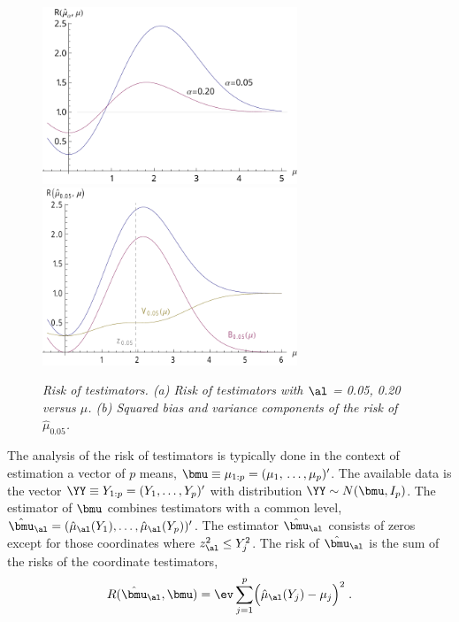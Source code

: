 \documentclass[12pt]{article}
\begin{document}
 \begin{figure}
 \caption{ \label{fig:risk} \sl Risk of testimators. (a) Risk of testimators with
 $\al$ = 0.05, 0.20 versus $\mu$. (b) Squared bias and variance components of the
 risk of $\hat\mu_{0.05}$. } 
 \vspace{0.1in}
\centerline{
 \includegraphics[width=3.0in]{figures/risk_a}
 \includegraphics[width=3.0in]{figures/risk_b} }
 \vspace{0.2in}
 \end{figure}
 

 The analysis of the risk of testimators is typically done in the context of
 estimation a vector of $p$ means, $\bmu \equiv \mu_{1:p} =
 (\mu_1, \,\ldots, \mu_p)'$.  The available data is the vector $\YY \equiv Y_{1:p} =
 (Y_1, \ldots, Y_p)'$ with distribution $\YY \sim N(\bmu,I_p)$.  The estimator
 of $\bmu$ combines testimators with a common level, $\hat{\bmu}_\al =
 (\hat\mu_\al(Y_1), \ldots, \hat\mu_\al(Y_p))'$.  The estimator $\hat{\bmu}_\al$
 consists of zeros except for those coordinates where $z_\al^2 \le Y_j^2$.  The
 risk of $\hat{\bmu}_\al$ is the sum of the risks of the coordinate testimators,
 \begin{equation}
    R(\hat{\bmu}_\al, \bmu) 
      = \ev \sum_{j=1}^p \Bigl( \hat{\mu}_{\al}(Y_j) - \mu_j \Bigr)^2 \;.
 \label{eq:risk}
 \end{equation}
\end{document}
